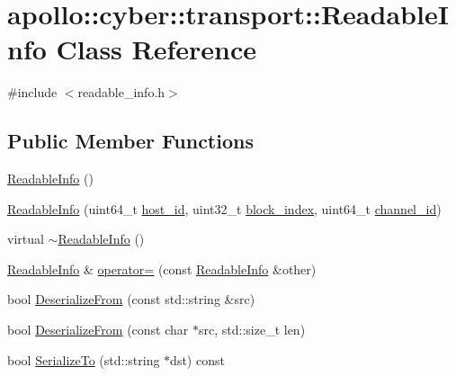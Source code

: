 \hypertarget{classapollo_1_1cyber_1_1transport_1_1ReadableInfo}{\section{apollo\-:\-:cyber\-:\-:transport\-:\-:Readable\-Info Class Reference}
\label{classapollo_1_1cyber_1_1transport_1_1ReadableInfo}
}


{\ttfamily \#include $<$readable\-\_\-info.\-h$>$}

\subsection*{Public Member Functions}
\begin{DoxyCompactItemize}
\item 
\hyperlink{classapollo_1_1cyber_1_1transport_1_1ReadableInfo_acd6e0f6ffcc79124111f79442f5625a6}{Readable\-Info} ()
\item 
\hyperlink{classapollo_1_1cyber_1_1transport_1_1ReadableInfo_a95a15b3e47895c781532f29429499cfa}{Readable\-Info} (uint64\-\_\-t \hyperlink{classapollo_1_1cyber_1_1transport_1_1ReadableInfo_ad9121226c3878f96c90bcfe7a65d2bcb}{host\-\_\-id}, uint32\-\_\-t \hyperlink{classapollo_1_1cyber_1_1transport_1_1ReadableInfo_affd26c2e8866cce02597a068c00dc2d4}{block\-\_\-index}, uint64\-\_\-t \hyperlink{classapollo_1_1cyber_1_1transport_1_1ReadableInfo_a2504f4ab55522fed58138e1ee8e52590}{channel\-\_\-id})
\item 
virtual \hyperlink{classapollo_1_1cyber_1_1transport_1_1ReadableInfo_a41481511f2a50b1d262b3ded2591b0da}{$\sim$\-Readable\-Info} ()
\item 
\hyperlink{classapollo_1_1cyber_1_1transport_1_1ReadableInfo}{Readable\-Info} \& \hyperlink{classapollo_1_1cyber_1_1transport_1_1ReadableInfo_a7f8b816e884ada7aeb2750bdea7ef017}{operator=} (const \hyperlink{classapollo_1_1cyber_1_1transport_1_1ReadableInfo}{Readable\-Info} \&other)
\item 
bool \hyperlink{classapollo_1_1cyber_1_1transport_1_1ReadableInfo_aee7d24426583cf0a2d558a4eba85a734}{Deserialize\-From} (const std\-::string \&src)
\item 
bool \hyperlink{classapollo_1_1cyber_1_1transport_1_1ReadableInfo_a6ff3d12b4510b306d5f16a445c9b039a}{Deserialize\-From} (const char $\ast$src, std\-::size\-\_\-t len)
\item 
bool \hyperlink{classapollo_1_1cyber_1_1transport_1_1ReadableInfo_a0907eed0bbfaffb47b441448e2cdf013}{Serialize\-To} (std\-::string $\ast$dst) const 

\end{DoxyCompactItemize}
